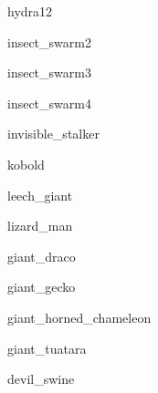 \documentclass[letterpaper,serif]{module}
\begin{document}
\begin{newmonster}{hydra12}\end{newmonster}

\begin{newmonster}{insect_swarm2}\end{newmonster}

\begin{newmonster}{insect_swarm3}\end{newmonster}

\begin{newmonster}{insect_swarm4}\end{newmonster}

\begin{newmonster}{invisible_stalker}\end{newmonster}

\begin{newmonster}{kobold}\end{newmonster}

\begin{newmonster}{leech_giant}\end{newmonster}

\begin{newmonster}{lizard_man}\end{newmonster}

\begin{newmonster}{giant_draco}\end{newmonster}

\begin{newmonster}{giant_gecko}\end{newmonster}

\begin{newmonster}{giant_horned_chameleon}\end{newmonster}

\begin{newmonster}{giant_tuatara}\end{newmonster}

\begin{newmonster}{devil_swine}\end{newmonster}
\end{document}
